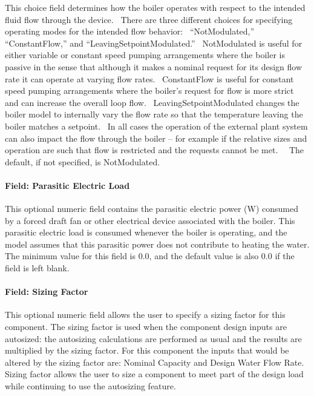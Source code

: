 This choice field determines how the boiler operates with respect to the intended fluid flow through the device.~ There are three different choices for specifying operating modes for the intended flow behavior:~ ``NotModulated,'' ``ConstantFlow,'' and ``LeavingSetpointModulated.''~ NotModulated is useful for either variable or constant speed pumping arrangements where the boiler is passive in the sense that although it makes a nominal request for its design flow rate it can operate at varying flow rates.~ ConstantFlow is useful for constant speed pumping arrangements where the boiler's request for flow is more strict and can increase the overall loop flow.~ LeavingSetpointModulated changes the boiler model to internally vary the flow rate so that the temperature leaving the boiler matches a setpoint.~ In all cases the operation of the external plant system can also impact the flow through the boiler -- for example if the relative sizes and operation are such that flow is restricted and the requests cannot be met.~~ The default, if not specified, is NotModulated.

\paragraph{Field: Parasitic Electric Load}\label{field-parasitic-electric-load-000}

This optional numeric field contains the parasitic electric power (W) consumed by a forced draft fan or other electrical device associated with the boiler. This parasitic electric load is consumed whenever the boiler is operating, and the model assumes that this parasitic power does not contribute to heating the water. The minimum value for this field is 0.0, and the default value is also 0.0 if the field is left blank.

\paragraph{Field: Sizing Factor}\label{field-sizing-factor-10}

This optional numeric field allows the user to specify a sizing factor for this component. The sizing factor is used when the component design inputs are autosized: the autosizing calculations are performed as usual and the results are multiplied by the sizing factor. For this component the inputs that would be altered by the sizing factor are: Nominal Capacity and Design Water Flow Rate. Sizing factor allows the user to size a component to meet part of the design load while continuing to use the autosizing feature.

